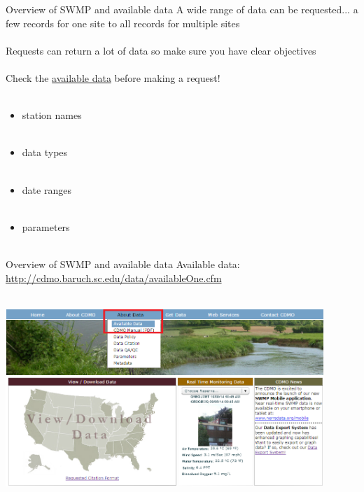 \documentclass[xcolor=svgnames]{beamer}\usepackage[]{graphicx}\usepackage[]{color}
\begin{document}
\begin{frame}{Overview of SWMP and available data}
A wide range of data can be requested... a few records for one site to all records for multiple sites \\~\\
Requests can return a lot of data so make sure you have clear objectives \\~\\
Check the \href{http://cdmo.baruch.sc.edu/data/availableOne.cfm}{available data} before making a request! \\~\\
\begin{itemize}
\item station names \\~\\
\item data types \\~\\
\item date ranges \\~\\
\item parameters \\~\\
\end{itemize}
\end{frame}

\begin{frame}[t]{Overview of SWMP and available data}
Available data: \href{http://cdmo.baruch.sc.edu/data/availableOne.cfm}{http://cdmo.baruch.sc.edu/data/availableOne.cfm}\\~\\
\centerline{\includegraphics[width = 0.9\textwidth]{avail_dat2.png}}
\end{frame}
\end{document}
